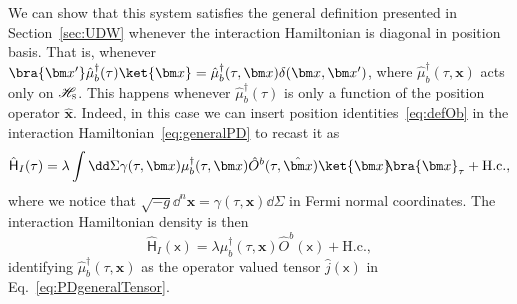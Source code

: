 \documentclass[letterpaper,12pt,titlepage,oneside,final]{book}
\newcommand{\mf}{\mathsf}%
\newcommand{\tc}[1]{\textsc{#1}}
\begin{document}
We can show that this system satisfies the general definition presented in Section~\ref{sec:UDW} whenever the interaction Hamiltonian is diagonal in position basis. That is, whenever $\bra{\bm x'}\hat{\mu}_b^\dagger(\tau)\ket{\bm x} = \hat{\mu}_b^\dagger(\tau,\bm x)\delta(\bm x, \bm x')$, where $\hat{\mu}_b^\dagger(\tau,\bm x)$ acts only on $\mathscr{H}_\tc{s}$. This happens whenever $\hat{\mu}_b^\dagger(\tau)$ is only a function of the position operator $\hat{\bm x}$. Indeed, in this case we can insert position identities~\eqref{eq:defOb} in the interaction Hamiltonian~\eqref{eq:generalPD} to recast it as
\begin{equation}
    \hat{\mathsf{H}}_I(\tau) = \lambda \int \dd \Sigma \gamma(\tau,\bm x)\mu^\dagger_b(\tau,\bm x)\hat{O}^b(\tau,\hat{\bm x})\ket{\bm x}\!\!\bra{\bm x}_\tau + \text{H.c.},
\end{equation}
where we notice that $\sqrt{-g} \dd^n \bm x = \gamma(\tau,\bm x) \dd \Sigma$ in Fermi normal coordinates. The interaction Hamiltonian density is then 
\begin{equation}
    \hat{\mathsf{H}}_I(\mf x) = \lambda \mu^\dagger_b(\tau,\bm x)\hat{O}^b(\mf x) + \text{H.c.},
\end{equation}
identifying $\hat{\mu}_b^\dagger(\tau,\bm x)$ as the operator valued tensor $\hat{j}(\mf x)$ in Eq.~\eqref{eq:PDgeneralTensor}.

\end{document}
